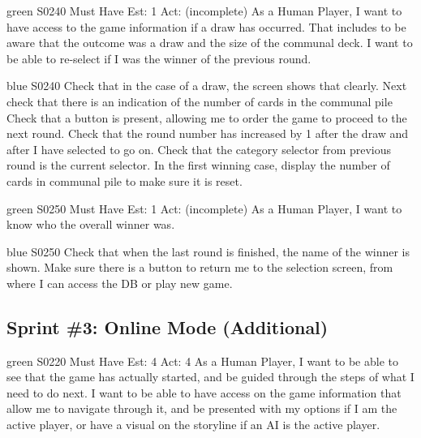 
\newpage

\begin{card}{green}
{S0240}
{Must Have}
{Est: 1}
{Act: (incomplete)}
As a Human Player, I want to have access to the game information if a draw has occurred. 
That includes to be aware that the outcome was a draw and the size of the communal deck. 
I want to be able to re-select if I was the winner of the previous round. 
\end{card}

\begin{card}{blue}
{S0240}{}{}{}
Check that in the case of a draw, the screen shows that clearly. 
Next check that there is an indication of the number of cards in the communal pile Check that a button is present, allowing me to order the game to proceed to the next round. 
Check that the round number has increased by 1 after the draw and after I have selected to go on. 
Check that the category selector from previous round is the current selector. 
In the first winning case, display the number of cards in communal pile to make sure it is reset.
\end{card}


\newpage

\begin{card}{green}
{S0250}
{Must Have}
{Est: 1}
{Act: (incomplete)}
As a Human Player, I want to know who the overall winner was.
\end{card}

\begin{card}{blue}
{S0250}{}{}{}
Check that when the last round is finished, the name of the winner is shown. Make sure there is a button to return me to the selection screen, from where I can access the DB or play new game.
\end{card}


\newpage
\subsection{Sprint \#3: Online Mode (Additional)}
\label{appendix:user_stories_online_additional}
\bigskip


\begin{card}{green}
{S0220}
{Must Have}
{Est: 4}
{Act: 4}
As a Human Player, I want to be able to see that the game has actually started, and be guided through the steps of what I need to do next. 
I want to be able to have access on the game information that allow me to navigate through it, and be presented with my options if I am the active player, or have a visual on the storyline if an AI is the active player.
\end{card}

